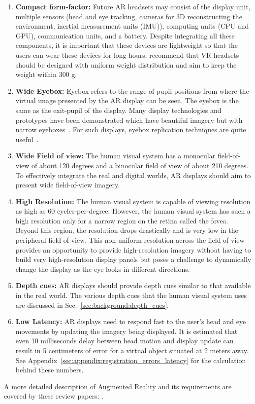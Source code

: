 \begin{enumerate}
    \item \textbf{Compact form-factor:} Future AR headsets may consist of the display unit, multiple sensors (head and eye tracking, cameras for 3D reconstructing the environment, inertial measurement units (IMU)), computing units (CPU and GPU), communication units, and a battery. Despite integrating all these components, it is important that these devices are lightweight so that the users can wear these devices for long hours. \cite{yan2018effects} recommend that VR headsets should be designed with uniform weight distribution and aim to keep the weight within 300 g.
    \item \textbf{Wide Eyebox:} Eyebox refers to the range of pupil positions from where the virtual image presented by the AR display can be seen. The eyebox is the same as the exit-pupil of the display. Many display technologies and prototypes have been demonstrated which have beautiful imagery but with narrow eyeboxes~\cite{Maimone2017Holographic,westheimer1966maxwellian}. For such displays, eyebox replication techniques are quite useful~\cite{Jang2017Retinal}. 
    \item \textbf{Wide Field of view:} The human visual system has a monocular field-of-view of about 120 degrees and a binocular field of view of about 210 degrees. To effectively integrate the real and digital worlds, AR displays should aim to present wide field-of-view imagery.
    \item \textbf{High Resolution:} The human visual system is capable of viewing resolution as high as 60 cycles-per-degree. However, the human visual system has such a high resolution only for a narrow region on the retina called the fovea. Beyond this region, the resolution drops drastically and is very low in the peripheral field-of-view. This non-uniform resolution across the field-of-view provides an opportunity to provide high-resolution imagery without having to build very high-resolution display panels but poses a challenge to dynamically change the display as the eye looks in different directions.
    \item \textbf{Depth cues:} AR displays should provide depth cues similar to that available in the real world. The various depth cues that the human visual system uses are discussed in Sec.~\ref{sec:background:depth_cues}. 
    \item \textbf{Low Latency:} AR displays need to respond fast to the user’s head and eye movements by updating the imagery being displayed. It is estimated that even 10 milliseconds delay between head motion and display update can result in 5 centimeters of error for a virtual object situated at 2 meters away. See Appendix~\ref{sec:appendix:registration_errors_latency} for the calculation behind these numbers.
\end{enumerate}
A more detailed description of Augmented Reality and its requirements are covered by these review papers: \cite{azuma2001recent,carmigniani2011augmented}. 

